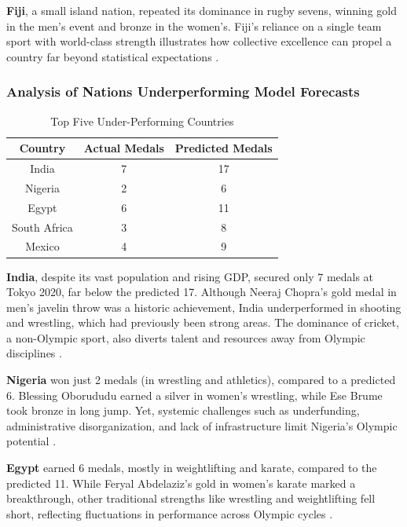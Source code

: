 \documentclass[11pt,twoside]{article}
\numberwithin{Theorem}{section}
\numberwithin{Definition}{section}
\numberwithin{Lemma}{section}
\numberwithin{Algorithm}{section}
\numberwithin{equation}{section}
\begin{document}
\textbf{Fiji}, a small island nation, repeated its dominance in rugby sevens, winning gold in the men’s event and bronze in the women’s. Fiji’s reliance on a single team sport with world-class strength illustrates how collective excellence can propel a country far beyond statistical expectations \citep{darby2017}.  

\subsubsection{Analysis of Nations Underperforming Model Forecasts}

\begin{table}[H]
\centering
\caption{Top Five Under-Performing Countries}
\label{tab:under}
\begin{tabular}{ccc}
\hline
Country & Actual Medals & Predicted Medals \\
\hline
India & 7 & 17 \\
Nigeria & 2 & 6 \\
Egypt & 6 & 11 \\
South Africa & 3 & 8 \\
Mexico & 4 & 9 \\
\hline
\end{tabular}
\end{table}

\textbf{India}, despite its vast population and rising GDP, secured only 7 medals at Tokyo 2020, far below the predicted 17. Although Neeraj Chopra’s gold medal in men’s javelin throw was a historic achievement, India underperformed in shooting and wrestling, which had previously been strong areas. The dominance of cricket, a non-Olympic sport, also diverts talent and resources away from Olympic disciplines \citep{kaplanidou2010}.  

\textbf{Nigeria} won just 2 medals (in wrestling and athletics), compared to a predicted 6. Blessing Oborududu earned a silver in women’s wrestling, while Ese Brume took bronze in long jump. Yet, systemic challenges such as underfunding, administrative disorganization, and lack of infrastructure limit Nigeria’s Olympic potential \citep{amusa2003}.  

\textbf{Egypt} earned 6 medals, mostly in weightlifting and karate, compared to the predicted 11. While Feryal Abdelaziz’s gold in women’s karate marked a breakthrough, other traditional strengths like wrestling and weightlifting fell short, reflecting fluctuations in performance across Olympic cycles \citep{solberg2007}.  
\end{document}

